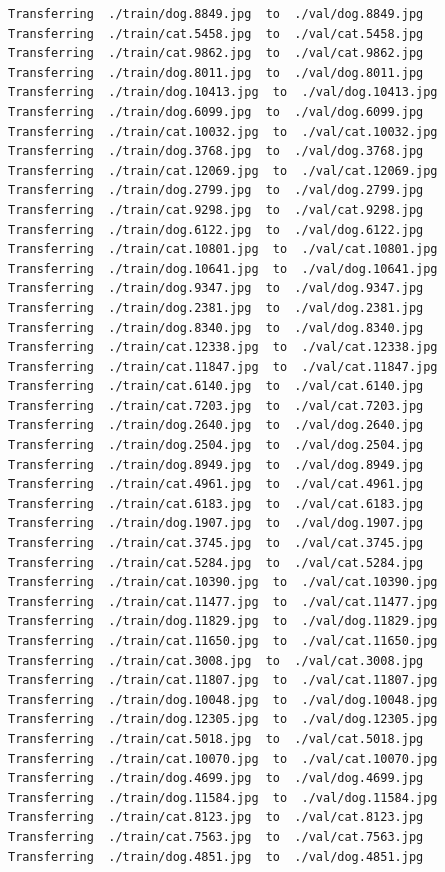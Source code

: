 \documentclass[]{book}
\theoremstyle{definition}
\theoremstyle{definition}
\theoremstyle{definition}
\theoremstyle{remark}
\begin{document}
\begin{verbatim}
Transferring  ./train/dog.8849.jpg  to  ./val/dog.8849.jpg
Transferring  ./train/cat.5458.jpg  to  ./val/cat.5458.jpg
Transferring  ./train/cat.9862.jpg  to  ./val/cat.9862.jpg
Transferring  ./train/dog.8011.jpg  to  ./val/dog.8011.jpg
Transferring  ./train/dog.10413.jpg  to  ./val/dog.10413.jpg
Transferring  ./train/dog.6099.jpg  to  ./val/dog.6099.jpg
Transferring  ./train/cat.10032.jpg  to  ./val/cat.10032.jpg
Transferring  ./train/dog.3768.jpg  to  ./val/dog.3768.jpg
Transferring  ./train/cat.12069.jpg  to  ./val/cat.12069.jpg
Transferring  ./train/dog.2799.jpg  to  ./val/dog.2799.jpg
Transferring  ./train/cat.9298.jpg  to  ./val/cat.9298.jpg
Transferring  ./train/dog.6122.jpg  to  ./val/dog.6122.jpg
Transferring  ./train/cat.10801.jpg  to  ./val/cat.10801.jpg
Transferring  ./train/dog.10641.jpg  to  ./val/dog.10641.jpg
Transferring  ./train/dog.9347.jpg  to  ./val/dog.9347.jpg
Transferring  ./train/dog.2381.jpg  to  ./val/dog.2381.jpg
Transferring  ./train/dog.8340.jpg  to  ./val/dog.8340.jpg
Transferring  ./train/cat.12338.jpg  to  ./val/cat.12338.jpg
Transferring  ./train/cat.11847.jpg  to  ./val/cat.11847.jpg
Transferring  ./train/cat.6140.jpg  to  ./val/cat.6140.jpg
Transferring  ./train/cat.7203.jpg  to  ./val/cat.7203.jpg
Transferring  ./train/dog.2640.jpg  to  ./val/dog.2640.jpg
Transferring  ./train/dog.2504.jpg  to  ./val/dog.2504.jpg
Transferring  ./train/dog.8949.jpg  to  ./val/dog.8949.jpg
Transferring  ./train/cat.4961.jpg  to  ./val/cat.4961.jpg
Transferring  ./train/cat.6183.jpg  to  ./val/cat.6183.jpg
Transferring  ./train/dog.1907.jpg  to  ./val/dog.1907.jpg
Transferring  ./train/cat.3745.jpg  to  ./val/cat.3745.jpg
Transferring  ./train/cat.5284.jpg  to  ./val/cat.5284.jpg
Transferring  ./train/cat.10390.jpg  to  ./val/cat.10390.jpg
Transferring  ./train/cat.11477.jpg  to  ./val/cat.11477.jpg
Transferring  ./train/dog.11829.jpg  to  ./val/dog.11829.jpg
Transferring  ./train/cat.11650.jpg  to  ./val/cat.11650.jpg
Transferring  ./train/cat.3008.jpg  to  ./val/cat.3008.jpg
Transferring  ./train/cat.11807.jpg  to  ./val/cat.11807.jpg
Transferring  ./train/dog.10048.jpg  to  ./val/dog.10048.jpg
Transferring  ./train/dog.12305.jpg  to  ./val/dog.12305.jpg
Transferring  ./train/cat.5018.jpg  to  ./val/cat.5018.jpg
Transferring  ./train/cat.10070.jpg  to  ./val/cat.10070.jpg
Transferring  ./train/dog.4699.jpg  to  ./val/dog.4699.jpg
Transferring  ./train/dog.11584.jpg  to  ./val/dog.11584.jpg
Transferring  ./train/cat.8123.jpg  to  ./val/cat.8123.jpg
Transferring  ./train/cat.7563.jpg  to  ./val/cat.7563.jpg
Transferring  ./train/dog.4851.jpg  to  ./val/dog.4851.jpg

\end{verbatim}
\end{document}
